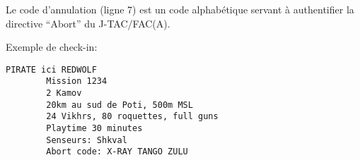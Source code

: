     \item Le code d’annulation (ligne 7) est un code alphabétique servant à authentifier la directive “Abort” du J-TAC/FAC(A).
    
    \begin{minipage}{\linewidth}
    \item Exemple de check-in:
    \begin{lstlisting}[caption=Check-in, label=checkin]
	PIRATE ici REDWOLF
    	Mission 1234
	    2 Kamov
	    20km au sud de Poti, 500m MSL
    	24 Vikhrs, 80 roquettes, full guns
	    Playtime 30 minutes
    	Senseurs: Shkval
	    Abort code: X-RAY TANGO ZULU
	\end{lstlisting}
    \end{minipage}
\ed
